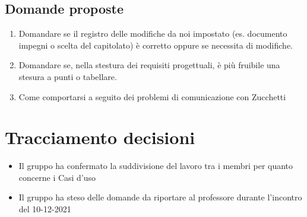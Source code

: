 \subsection{Domande proposte}
\begin{enumerate}
	\item Domandare se il registro delle modifiche da noi impostato (es. documento impegni o scelta del capitolato) è corretto oppure se necessita di modifiche.
	\item Domandare se, nella stestura dei requisiti progettuali, è più fruibile una stesura a punti o tabellare.
	\item Come comportarsi a seguito dei problemi di comunicazione con Zucchetti
\end{enumerate}

\section{Tracciamento decisioni}
\begin{itemize}
	\item Il gruppo ha confermato la suddivisione del lavoro tra i membri per quanto concerne i Casi d'uso
	\item Il gruppo ha steso delle domande da riportare al professore durante l'incontro del 10-12-2021
\end{itemize}